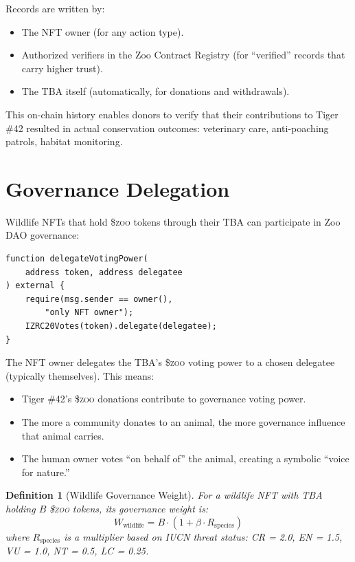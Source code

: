 \documentclass[11pt,letterpaper]{article}
\newtheorem{definition}{Definition}[section]
\newcommand{\ZOO}{\$\textsc{zoo}}
\begin{document}
Records are written by:
\begin{itemize}
    \item The NFT owner (for any action type).
    \item Authorized verifiers in the Zoo Contract Registry (for ``verified'' records that carry higher trust).
    \item The TBA itself (automatically, for donations and withdrawals).
\end{itemize}

This on-chain history enables donors to verify that their contributions to Tiger \#42 resulted in actual conservation outcomes: veterinary care, anti-poaching patrols, habitat monitoring.

\section{Governance Delegation}
\label{sec:governance}

Wildlife NFTs that hold \ZOO{} tokens through their TBA can participate in Zoo DAO governance:

\begin{lstlisting}[language=Solidity,caption=Governance delegation from TBA]
function delegateVotingPower(
    address token, address delegatee
) external {
    require(msg.sender == owner(),
        "only NFT owner");
    IZRC20Votes(token).delegate(delegatee);
}
\end{lstlisting}

The NFT owner delegates the TBA's \ZOO{} voting power to a chosen delegatee (typically themselves). This means:

\begin{itemize}
    \item Tiger \#42's \ZOO{} donations contribute to governance voting power.
    \item The more a community donates to an animal, the more governance influence that animal carries.
    \item The human owner votes ``on behalf of'' the animal, creating a symbolic ``voice for nature.''
\end{itemize}

\begin{definition}[Wildlife Governance Weight]
For a wildlife NFT with TBA holding $B$ \ZOO{} tokens, its governance weight is:
\begin{equation}
W_{\text{wildlife}} = B \cdot (1 + \beta \cdot R_{\text{species}})
\end{equation}
where $R_{\text{species}}$ is a multiplier based on IUCN threat status: CR = 2.0, EN = 1.5, VU = 1.0, NT = 0.5, LC = 0.25.
\end{definition}
\end{document}
